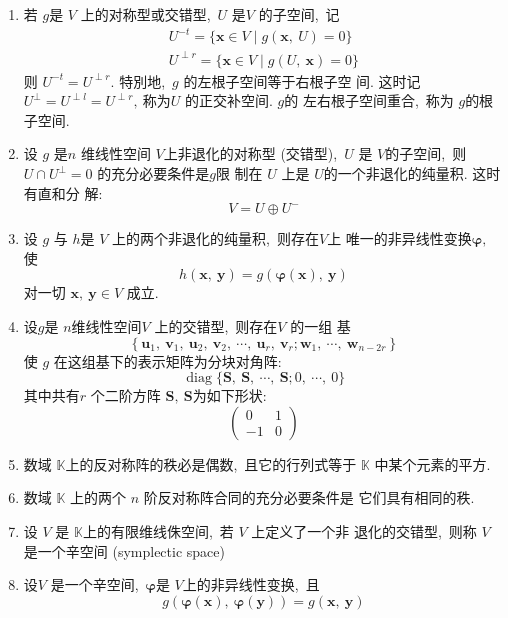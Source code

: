 \begin{enumerate}
		\item 若 $ g  $是  $V $ 上的对称型或交错型,\   $U $ 是$  V $ 的子空间,\  记
		$$\begin{array}{c}
			U^{-t}=\{\boldsymbol{x} \in V \mid g(\boldsymbol{x},\  U)=0\} \\
			U^{\perp r}=\{\boldsymbol{x} \in V \mid g(U,\  \boldsymbol{x})=0\}
		\end{array}$$
		则 $ U^{-t}=U^{\perp r} .$ 特別地,\  $ g $ 的左根子空间等于右根子空 间.
		这时记  $U^{\perp}=U^{\perp l}=U^{\perp r} ,\  $称为$  U$  的正交补空间.  $g  $的 左右根子空间重合,\  称为  $g  $的根子空间.
		\item 设  $g $ 是$  n $ 维线性空间  $V  $上非退化的对称型 (交错型),\  $ U $ 是  $V  $的子空间,\  则 $ U \cap U^{\perp}=0 $ 的充分必要条件是$  g  $限 制在  $U $ 上是  $U  $的一个非退化的纯量积. 这时有直和分 解:
		$$V=U \oplus U^{-}$$
		\item 设  $g $ 与  $h  $是  $V $ 上的两个非退化的纯量积,\  则存在$  V  $上 唯一的非异线性变换$\boldsymbol{\varphi},\ $ 使
		$$h(\boldsymbol{x},\  \boldsymbol{y})=g(\boldsymbol{\varphi}(\boldsymbol{x}),\  \boldsymbol{y})$$
		对一切  $\boldsymbol{x},\  \boldsymbol{y} \in V$  成立.
		\item 设$  g  $是 $ n  $维线性空间$  V$  上的交错型,\  则存在$  V $ 的一组 基
		$$\left\{\boldsymbol{u}_{1},\  \boldsymbol{v}_{1},\  \boldsymbol{u}_{2},\  \boldsymbol{v}_{2},\  \cdots,\  \boldsymbol{u}_{r},\  \boldsymbol{v}_{r} ; \boldsymbol{w}_{1},\  \cdots,\  \boldsymbol{w}_{n-2 r}\right\}$$
		使  $g $ 在这组基下的表示矩阵为分块对角阵:
		$$\operatorname{diag}\{\boldsymbol{S},\  \boldsymbol{S},\  \cdots,\  \boldsymbol{S} ; 0,\  \cdots,\  0\}$$
		其中共有$  r $ 个二阶方阵 $ \boldsymbol{S},\  \boldsymbol{S}  $为如下形状:
		$$\left(\begin{array}{cc}
			0 & 1 \\
			-1 & 0
		\end{array}\right)$$
		\item 数域  $\mathbb{K}  $上的反对称阵的秩必是偶数,\  且它的行列式等于  $\mathbb{K}$  中某个元素的平方.
		\item 数域 $ \mathbb{K} $ 上的两个 $ n $ 阶反对称阵合同的充分必要条件是 它们具有相同的秩.
		\item 设 $ V $ 是  $\mathbb{K}  $上的有限维线侏空间,\  若  $V $ 上定义了一个非 退化的交错型,\  则称 $ V $ 是一个辛空间 (symplectic space)
		\item 设$  V$  是一个辛空间,\   $\boldsymbol{\varphi}  $是 $ V  $上的非异线性变换,\  且
		$$g(\boldsymbol{\varphi}(\boldsymbol{x}),\  \boldsymbol{\varphi}(\boldsymbol{y}))=g(\boldsymbol{x},\  \boldsymbol{y})$$

\end{enumerate}
